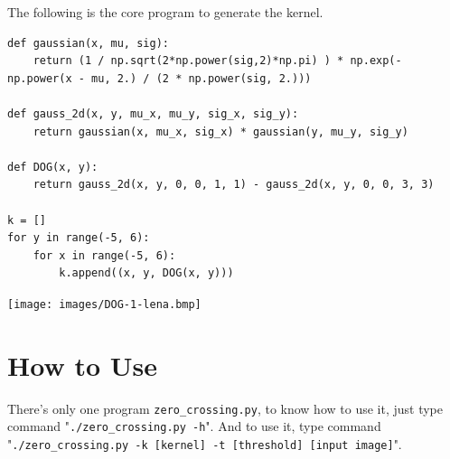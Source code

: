 \documentclass[10pt,a4paper]{article}
\newenvironment{Figure}
  {\par\medskip\noindent\minipage{\linewidth}}
  {\endminipage\par\medskip}
\begin{document}
\begin{multicols}{2}
The following is the core program to generate the kernel.

\begin{lstlisting}
def gaussian(x, mu, sig):
	return (1 / np.sqrt(2*np.power(sig,2)*np.pi) ) * np.exp(-np.power(x - mu, 2.) / (2 * np.power(sig, 2.)))

def gauss_2d(x, y, mu_x, mu_y, sig_x, sig_y):
	return gaussian(x, mu_x, sig_x) * gaussian(y, mu_y, sig_y)

def DOG(x, y):
	return gauss_2d(x, y, 0, 0, 1, 1) - gauss_2d(x, y, 0, 0, 3, 3)

k = []
for y in range(-5, 6):
	for x in range(-5, 6):
		k.append((x, y, DOG(x, y)))
\end{lstlisting}

\begin{Figure}
\centering
\texttt{[image: images/DOG-1-lena.bmp]}
\label{fig:DOG-1-lena.bmp}
\end{Figure}

\section{How to Use}

There's only one program \texttt{zero\_crossing.py}, to know how to use it, just type command "\texttt{./zero\_crossing.py -h}". And to use it, type command "\texttt{./zero\_crossing.py -k [kernel] -t [threshold] [input image]}".

\end{multicols}
\end{document}
